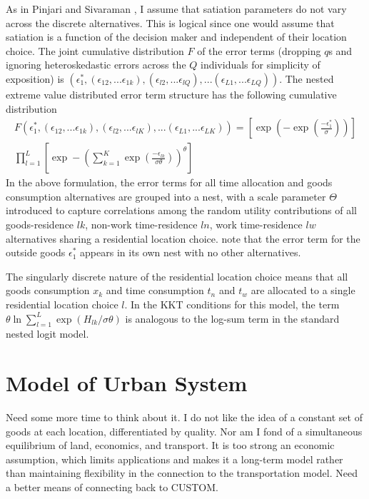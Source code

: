 As in Pinjari and Sivaraman \cite{RawoofPinjari2012ASystem}, I assume that satiation parameters do not vary across the discrete alternatives. This is logical since one would assume that satiation is a function of the decision maker and independent of their location choice. The joint cumulative distribution $F$ of the error terms (dropping $q$s and ignoring heteroskedastic errors across the $Q$ individuals for simplicity of exposition) is $\left(\epsilon_{1}^*,(\epsilon_{12},...\epsilon_{1k}),(\epsilon_{l2},...\epsilon_{lQ}),...(\epsilon_{L1},...\epsilon_{LQ})\right)$. The nested extreme value distributed error term structure has the following cumulative distribution
\begin{equation}
\begin{split}
    F\left(\epsilon_{1}^*,(\epsilon_{12},...\epsilon_{1k}),(\epsilon_{l2},...\epsilon_{lK}),...(\epsilon_{L1},...\epsilon_{LK})\right) = \left[\exp\left(-\exp\left(\frac{-\epsilon_{1}^*}{\sigma}\right)\right)\right] \\ \prod_{l=1}^L \left[\exp -\left(\sum_{k=1}^K\exp\left(\frac{-\epsilon_{lk}}{\sigma \theta}\right)\right)^\theta \right]
\end{split}
\end{equation}
In the above formulation, the error terms for all time allocation and goods consumption alternatives are grouped into a nest, with a scale parameter $\Theta$ introduced to capture correlations among the random utility contributions of all goods-residence $lk$, non-work time-residence $ln$, work time-residence $lw$ alternatives sharing a residential location choice. note that the error term for the outside goods $\epsilon_1^*$ appears in its own nest with no other alternatives.

The singularly discrete nature of the residential location choice means that all goods consumption $x_k$ and time consumption $t_n$ and $t_w$ are allocated to a single residential location choice $l$. In the KKT conditions for this model, the term $\theta \ln \sum_{l=1}^L \exp(H_{lk}/\sigma \theta)$ is analogous to the log-sum term in the standard nested logit model.

\section{Model of Urban System}
Need some more time to think about it. I do not like the idea of a constant set of goods at each location, differentiated by quality. Nor am I fond of a simultaneous equilibrium of land, economics, and transport. It is too strong an economic assumption, which limits applications and makes it a long-term model rather than maintaining flexibility in the connection to the transportation model. Need a better means of connecting back to CUSTOM.

